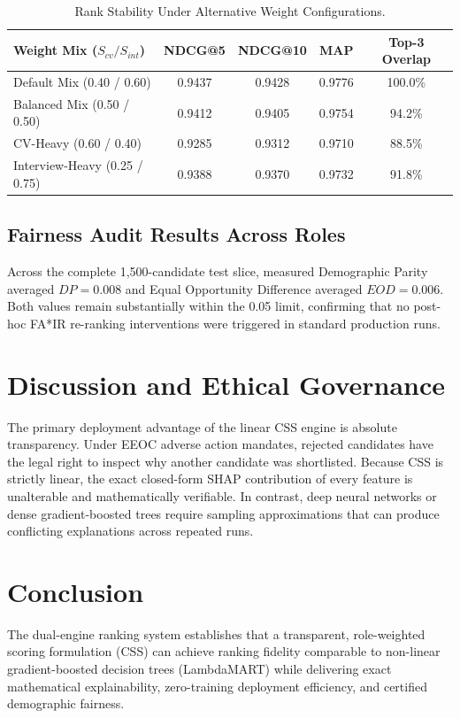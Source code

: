 \documentclass[conference]{IEEEtran}
\begin{document}
\begin{table}[htbp]
\caption{Rank Stability Under Alternative Weight Configurations.}
\begin{center}
\begin{tabular}{lcccc}
\toprule
\textbf{Weight Mix ($S_{cv} / S_{int}$)} & \textbf{NDCG@5} & \textbf{NDCG@10} & \textbf{MAP} & \textbf{Top-3 Overlap} \\
\midrule
Default Mix (0.40 / 0.60)   & 0.9437 & 0.9428 & 0.9776 & 100.0\% \\
Balanced Mix (0.50 / 0.50)  & 0.9412 & 0.9405 & 0.9754 & 94.2\% \\
CV-Heavy (0.60 / 0.40)      & 0.9285 & 0.9312 & 0.9710 & 88.5\% \\
Interview-Heavy (0.25 / 0.75)& 0.9388 & 0.9370 & 0.9732 & 91.8\% \\
\bottomrule
\end{tabular}
\label{tab:c3_sensitivity}
\end{center}
\end{table}

\subsection{Fairness Audit Results Across Roles}
Across the complete 1,500-candidate test slice, measured Demographic Parity averaged $DP = 0.008$ and Equal Opportunity Difference averaged $EOD = 0.006$. Both values remain substantially within the 0.05 limit, confirming that no post-hoc FA*IR re-ranking interventions were triggered in standard production runs.

\section{Discussion and Ethical Governance}
The primary deployment advantage of the linear CSS engine is absolute transparency. Under EEOC adverse action mandates, rejected candidates have the legal right to inspect why another candidate was shortlisted. Because CSS is strictly linear, the exact closed-form SHAP contribution of every feature is unalterable and mathematically verifiable. In contrast, deep neural networks or dense gradient-boosted trees require sampling approximations that can produce conflicting explanations across repeated runs.

\section{Conclusion}
The dual-engine ranking system establishes that a transparent, role-weighted scoring formulation (CSS) can achieve ranking fidelity comparable to non-linear gradient-boosted decision trees (LambdaMART) while delivering exact mathematical explainability, zero-training deployment efficiency, and certified demographic fairness.
\end{document}
